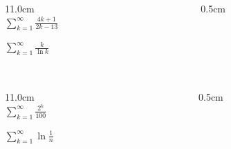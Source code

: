 \begin{frame}
\frametitle{}
\scriptsize

\vspace{0.2cm}

\begin{columns}
\begin{column}{11.0cm}
\\

$\displaystyle{\sum \limits_{k = 1}^{\infty} \frac{4k+1}{2k - 13}}$

\vspace{4.0cm}

$\displaystyle{\sum \limits_{k = 1}^{\infty} \frac{k}{\ln k}}$

\vspace{6.5cm}

\end{column}
\begin{column}{0.5cm}
	
\end{column}
\end{columns}
\end{frame}

\begin{frame}
\frametitle{}
\scriptsize

\vspace{0.2cm}

\begin{columns}
\begin{column}{11.0cm}
\\

$\displaystyle{\sum \limits_{k = 1}^{\infty} \frac{2^k}{100}}$

\vspace{4.0cm}

$\displaystyle{\sum \limits_{k = 1}^{\infty} \ln \frac{1}{n}}$

\vspace{6.5cm}

\end{column}
\begin{column}{0.5cm}
	
\end{column}
\end{columns}
\end{frame}

